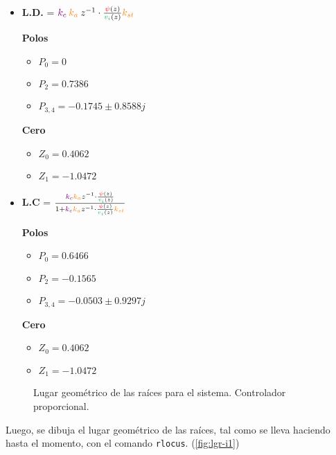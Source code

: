 \begin{itemize}
  \item \textbf{L.D.} = \( \mora{k_{c}} \nara{ k_{a}} z^{-1} \cdot \frac{\rojo{\psi}(z)}{\verd{v_i}(z)} \nara{k_{st}} \) 
 
  \begin{multicols}{2}
    \textbf{Polos}
    \begin{itemize}
      \item \(P_{0} = 0 \)
      \item \(P_{2} = 0.7386\)
      \item \(P_{3,4} = -0.1745 \pm 0.8588j\) 
    \end{itemize}
    \columnbreak
    \textbf{Cero}
    \begin{itemize}
      \item \(Z_0 = 0.4062\)
      \item \(Z_1 = -1.0472\)
    \end{itemize}
  \end{multicols}
  
  \item \textbf{L.C} =  \(\frac{  \mora{k_{c}} \nara{ k_{a}} z^{-1} \cdot \frac{\rojo{\psi}(z)}{\verd{v_i}(z)}} {1+ \mora{k_{c}} \nara{ k_{a}} z^{-1} \cdot \frac{\rojo{\psi}(z)}{\verd{v_i}(z)} \nara{k_{st}} }  \)
  
  \begin{multicols}{2}
    \textbf{Polos}
    \begin{itemize}
      \item \(P_{0} = 0.6466 \)
      \item \(P_{2} = -0.1565\)
      \item \(P_{3,4} = -0.0503 \pm 0.9297j\) 
    \end{itemize}
    \columnbreak
    \textbf{Cero}
    \begin{itemize}
      \item \(Z_0 = 0.4062\)
      \item \(Z_1 = -1.0472\)
    \end{itemize}
  \end{multicols}
\end{itemize}

\begin{figure}[ht]
    \centering
    
    \caption{Lugar geométrico de las raíces para el sistema. Controlador proporcional.}
    \label{fig:lgr-i1}
\end{figure}

Luego, se dibuja el lugar geométrico de las raíces, tal como se lleva haciendo
hasta el momento, con el comando \verb|rlocus|. (\autoref{fig:lgr-i1})
\newpage

